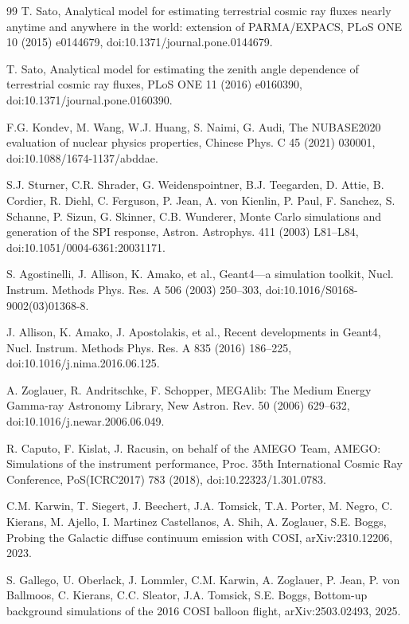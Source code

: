 \documentclass[11pt]{article}
\begin{document}
\begin{thebibliography}{99}
T. Sato, Analytical model for estimating terrestrial cosmic ray fluxes nearly anytime and anywhere in the world: extension of PARMA/EXPACS, PLoS ONE 10 (2015) e0144679, doi:10.1371/journal.pone.0144679.

T. Sato, Analytical model for estimating the zenith angle dependence of terrestrial cosmic ray fluxes, PLoS ONE 11 (2016) e0160390, doi:10.1371/journal.pone.0160390.

F.G. Kondev, M. Wang, W.J. Huang, S. Naimi, G. Audi, The NUBASE2020 evaluation of nuclear physics properties, Chinese Phys. C 45 (2021) 030001, doi:10.1088/1674-1137/abddae.

S.J. Sturner, C.R. Shrader, G. Weidenspointner, B.J. Teegarden, D. Attie, B. Cordier, R. Diehl, C. Ferguson, P. Jean, A. von Kienlin, P. Paul, F. Sanchez, S. Schanne, P. Sizun, G. Skinner, C.B. Wunderer, Monte Carlo simulations and generation of the SPI response, Astron. Astrophys. 411 (2003) L81--L84, doi:10.1051/0004-6361:20031171.

S. Agostinelli, J. Allison, K. Amako, et al., Geant4---a simulation toolkit, Nucl. Instrum. Methods Phys. Res. A 506 (2003) 250--303, doi:10.1016/S0168-9002(03)01368-8.

J. Allison, K. Amako, J. Apostolakis, et al., Recent developments in Geant4, Nucl. Instrum. Methods Phys. Res. A 835 (2016) 186--225, doi:10.1016/j.nima.2016.06.125.

A. Zoglauer, R. Andritschke, F. Schopper, MEGAlib: The Medium Energy Gamma-ray Astronomy Library, New Astron. Rev. 50 (2006) 629--632, doi:10.1016/j.newar.2006.06.049.

R. Caputo, F. Kislat, J. Racusin, on behalf of the AMEGO Team, AMEGO: Simulations of the instrument performance, Proc. 35th International Cosmic Ray Conference, PoS(ICRC2017) 783 (2018), doi:10.22323/1.301.0783.

C.M. Karwin, T. Siegert, J. Beechert, J.A. Tomsick, T.A. Porter, M. Negro, C. Kierans, M. Ajello, I. Martinez Castellanos, A. Shih, A. Zoglauer, S.E. Boggs, Probing the Galactic diffuse continuum emission with COSI, arXiv:2310.12206, 2023.

S. Gallego, U. Oberlack, J. Lommler, C.M. Karwin, A. Zoglauer, P. Jean, P. von Ballmoos, C. Kierans, C.C. Sleator, J.A. Tomsick, S.E. Boggs, Bottom-up background simulations of the 2016 COSI balloon flight, arXiv:2503.02493, 2025.


\end{thebibliography}
\end{document}
